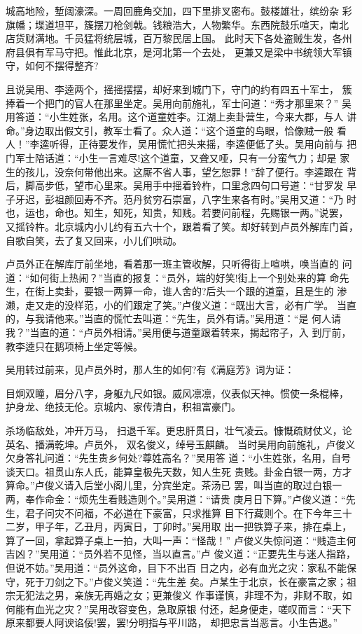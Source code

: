 城高地险，堑阔濠深。一周回鹿角交加，四下里排叉密布。鼓楼雄壮，缤纷杂
彩旗幡；堞道坦平，簇摆刀枪剑戟。钱粮浩大，人物繁华。东西院鼓乐喧天，南北
店货财满地。千员猛将统层城，百万黎民居上国。
此时天下各处盗贼生发，各州府县俱有军马守把。惟此北京，是河北第一个去处，
更兼又是梁中书统领大军镇守，如何不摆得整齐?

且说吴用、李逵两个，摇摇摆摆，却好来到城门下，守门的约有四五十军士，
簇捧着一个把门的官人在那里坐定。吴用向前施礼，军士问道：“秀才那里来？”
吴用答道：“小生姓张，名用。这个道童姓李。江湖上卖卦营生，今来大郡，与人
讲命。”身边取出假文引，教军士看了。众人道：“这个道童的鸟眼，恰像贼一般
看人！”李逵听得，正待要发作，吴用慌忙把头来摇，李逵便低了头。吴用向前与
把门军士陪话道：“小生一言难尽!这个道童，又聋又哑，只有一分蛮气力；却是
家生的孩儿，没奈何带他出来。这厮不省人事，望乞恕罪！”辞了便行。李逵跟在
背后，脚高步低，望市心里来。吴用手中摇着铃杵，口里念四句口号道：“甘罗发
早子牙迟，彭祖颜回寿不齐。范丹贫穷石崇富，八字生来各有时。”吴用又道：“乃
时也，运也，命也。知生，知死，知贵，知贱。若要问前程，先赐银一两。”说罢，
又摇铃杵。北京城内小儿约有五六十个，跟着看了笑。却好转到卢员外解库门首，
自歌自笑，去了复又回来，小儿们哄动。

卢员外正在解库厅前坐地，看着那一班主管收解，只听得街上喧哄，唤当直的
问道：“如何街上热闹？”当直的报复：“员外，端的好笑!街上一个别处来的算
命先生，在街上卖卦，要银一两算一命，谁人舍的?后头一个跟的道童，且是生的
渗濑，走又走的没样范，小的们跟定了笑。”卢俊义道：“既出大言，必有广学。
当直的，与我请他来。”当直的慌忙去叫道：“先生，员外有请。”吴用道：“是
何人请我？”当直的道：“卢员外相请。”吴用便与道童跟着转来，揭起帘子，入
到厅前，教李逵只在鹅项椅上坐定等候。

吴用转过前来，见卢员外时，那人生的如何?有《满庭芳》词为证：

目炯双瞳，眉分八字，身躯九尺如银。威风凛凛，仪表似天神。惯使一条棍棒，
护身龙、绝技无伦。京城内、家传清白，积祖富豪门。

杀场临敌处，冲开万马，
扫退千军。更忠肝贯日，壮气凌云。慷慨疏财仗义，论英名、播满乾坤。卢员外，
双名俊义，绰号玉麒麟。
当时吴用向前施礼，卢俊义欠身答礼问道：“先生贵乡何处?尊姓高名？”吴用答
道：“小生姓张，名用，自号谈天口。祖贯山东人氏，能算皇极先天数，知人生死
贵贱。卦金白银一两，方才算命。”卢俊义请入后堂小阁儿里，分宾坐定。茶汤已
罢，叫当直的取过白银一两，奉作命金：“烦先生看贱造则个。”吴用道：“请贵
庚月日下算。”卢俊义道：“先生，君子问灾不问福，不必道在下豪富，只求推算
目下行藏则个。在下今年三十二岁，甲子年，乙丑月，丙寅日，丁卯时。”吴用取
出一把铁算子来，排在桌上，算了一回，拿起算子桌上一拍，大叫一声：“怪哉！”
卢俊义失惊问道：“贱造主何吉凶？”吴用道：“员外若不见怪，当以直言。”卢
俊义道：“正要先生与迷人指路，但说不妨。”吴用道：“员外这命，目下不出百
日之内，必有血光之灾：家私不能保守，死于刀剑之下。”卢俊义笑道：“先生差
矣。卢某生于北京，长在豪富之家；祖宗无犯法之男，亲族无再婚之女；更兼俊义
作事谨慎，非理不为，非财不取，如何能有血光之灾？”吴用改容变色，急取原银
付还，起身便走，嗟叹而言：“天下原来都要人阿谀谄佞!罢，罢!分明指与平川路，
却把忠言当恶言。小生告退。”

